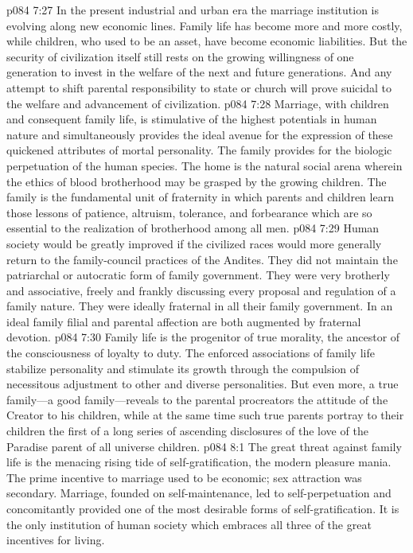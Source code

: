 \pc \vs p084 7:27 In the present industrial and urban era the marriage institution is evolving along new economic lines. Family life has become more and more costly, while children, who used to be an asset, have become economic liabilities. But the security of civilization itself still rests on the growing willingness of one generation to invest in the welfare of the next and future generations. And any attempt to shift parental responsibility to state or church will prove suicidal to the welfare and advancement of civilization.
\pc \vs p084 7:28 Marriage, with children and consequent family life, is stimulative of the highest potentials in human nature and simultaneously provides the ideal avenue for the expression of these quickened attributes of mortal personality. The family provides for the biologic perpetuation of the human species. The home is the natural social arena wherein the ethics of blood brotherhood may be grasped by the growing children. The family is the fundamental unit of fraternity in which parents and children learn those lessons of patience, altruism, tolerance, and forbearance which are so essential to the realization of brotherhood among all men.
\vs p084 7:29 Human society would be greatly improved if the civilized races would more generally return to the family\hyp{}council practices of the Andites. They did not maintain the patriarchal or autocratic form of family government. They were very brotherly and associative, freely and frankly discussing every proposal and regulation of a family nature. They were ideally fraternal in all their family government. In an ideal family filial and parental affection are both augmented by fraternal devotion.
\vs p084 7:30 Family life is the progenitor of true morality, the ancestor of the consciousness of loyalty to duty. The enforced associations of family life stabilize personality and stimulate its growth through the compulsion of necessitous adjustment to other and diverse personalities. But even more, a true family---a good family---reveals to the parental procreators the attitude of the Creator to his children, while at the same time such true parents portray to their children the first of a long series of ascending disclosures of the love of the Paradise parent of all universe children.
\vs p084 8:1 The great threat against family life is the menacing rising tide of self\hyp{}gratification, the modern pleasure mania. The prime incentive to marriage used to be economic; sex attraction was secondary. Marriage, founded on self\hyp{}maintenance, led to self\hyp{}perpetuation and concomitantly provided one of the most desirable forms of self\hyp{}gratification. It is the only institution of human society which embraces all three of the great incentives for living.
